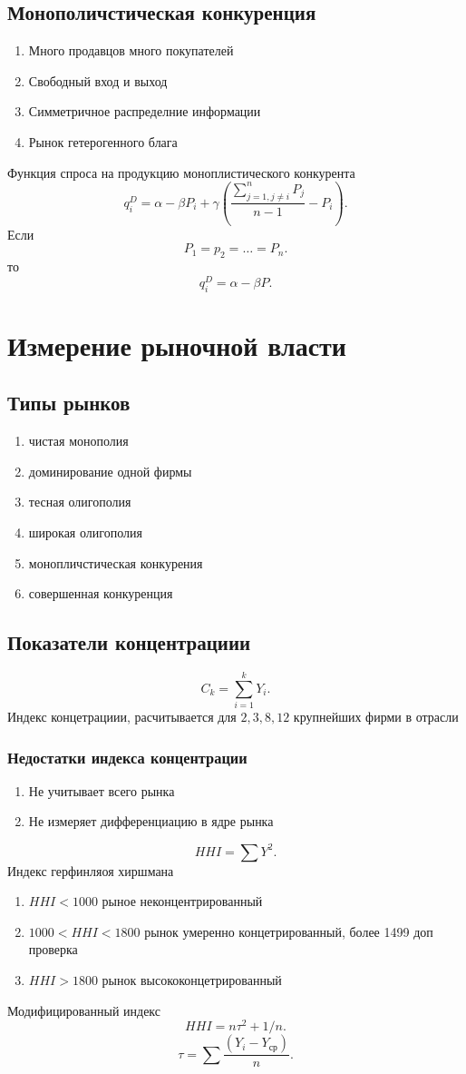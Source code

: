\documentclass[14pt]{extarticle}
\begin{document}
\subsection{Монополичстическая конкуренция}
\begin{enumerate}
    \item Много продавцов много покупателей
    \item Свободный вход и выход
    \item Симметричное распределние информации
    \item Рынок гетерогенного блага
\end{enumerate}
Функция спроса на продукцию моноплистического конкурента
\[
q_{i}^{D} = \alpha - \beta P_{i} + \gamma ( \frac{\sum_{j=1,j\neq i}^{n} P_{j}}{n - 1} - P_{i})
.\] 
Если
\[
    P_1 = p_2 = \dots = P_{n}
.\] 
то 
\[
q_{i}^{D} = \alpha - \beta P
.\] 
\section{Измерение рыночной власти}
\subsection{Типы рынков}
\begin{enumerate}
    \item чистая монополия
    \item доминирование одной фирмы
    \item тесная олигополия
    \item широкая олигополия
    \item монопличстическая конкурения
    \item совершенная конкуренция
\end{enumerate}
\subsection{Показатели концентрациии}
\[
C_{k} = \sum_{i = 1}^{k} Y_{i}
.\] 
Индекс концетрациии, расчитывается для $2,3,8,12$ крупнейших фирми в отрасли
\subsubsection{Недостатки индекса концентрации}
 \begin{enumerate}
    \item Не учитывает всего рынка
    \item Не измеряет дифференциацию в ядре рынка
\end{enumerate}
\[
HHI = \sum Y^2
.\] 
Индекс герфинляоя хиршмана
\begin{enumerate}
    \item $HHI < 1000$ рыное неконцентрированный
    \item  $1000 < HHI < 1800$ рынок умеренно концетрированный, более 1499 доп проверка
    \item  $HHI > 1800$ рынок высококонцетрированный
\end{enumerate}
Модифицированный индекс
\[
HHI = n \tau^2 + 1 / n
.\] 
\[
    \tau = \sum \frac{(Y_{i} - Y_{\text{ср}})}{n}
.\] 
\end{document}
